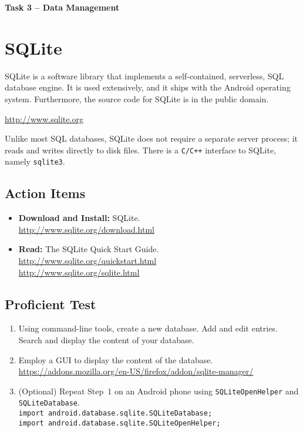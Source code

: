 \documentclass[11pt]{article}
\begin{document}
\begin{center}
{\bfseries \LARGE Task 3 -- Data Management}
\end{center}


\section{SQLite}

SQLite is a software library that implements a self-contained, serverless, SQL database engine.
It is used extensively, and it ships with the Android operating system.
Furthermore, the source code for SQLite is in the public domain.
\begin{center}
\url{http://www.sqlite.org}
\end{center}
Unlike most SQL databases, SQLite does not require a separate server process; it reads and writes directly to disk files.
There is a \texttt{C/C++} interface to SQLite, namely \texttt{sqlite3}.


\subsection*{Action Items}

\begin{itemize}
\item \textbf{Download and Install:} SQLite. \\
\url{http://www.sqlite.org/download.html}
\item \textbf{Read:} The SQLite Quick Start Guide.\\
\url{http://www.sqlite.org/quickstart.html}\\
\url{http://www.sqlite.org/sqlite.html}
\end{itemize}


\subsection*{Proficient Test}

\begin{enumerate}
\item Using command-line tools, create a new database.
Add and edit entries.
Search and display the content of your database.
\item Employ a GUI to display the content of the database.\\
\url{https://addons.mozilla.org/en-US/firefox/addon/sqlite-manager/}
\item (Optional) Repeat Step~1 on an Android phone using \texttt{SQLiteOpenHelper} and \texttt{SQLiteDatabase}.\\
\texttt{import android.database.sqlite.SQLiteDatabase;}\\
\texttt{import android.database.sqlite.SQLiteOpenHelper;}
\end{enumerate}
\end{document}
